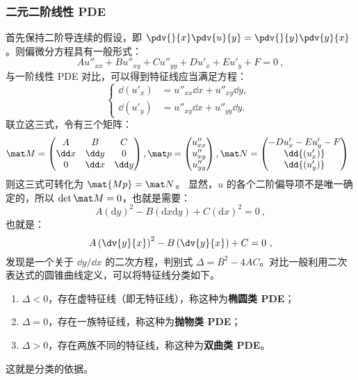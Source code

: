 \subsubsection{二元二阶线性 PDE}
首先保持二阶导连续的假设，即 $\pdv{}{x}\pdv{u}{y} = \pdv{}{y}\pdv{y}{x}$。则偏微分方程具有一般形式：
$$Au''_{xx} + Bu''_{xy} + Cu''_{yy} + Du'_{x} + Eu'_{y} + F = 0 ~,$$
与一阶线性 PDE 对比，可以得到特征线应当满足方程：
$$
\left\{
\begin{aligned}
\dd{(u'_{x})} &= u''_{xx} \dd x + u''_{xy} \dd y,\\
\dd{(u'_{y})} &= u''_{xy} \dd x + u''_{yy} \dd y.
\end{aligned}
\right. ~~$$
联立这三式，令有三个矩阵：
\begin{equation}
\mat M= 
\begin{pmatrix}
A & B & C \\
\dd x & \dd y & 0 \\
0 & \dd x & \dd y 
\end{pmatrix}, 
\mat p= 
\begin{pmatrix}
u''_{xx} \\
u''_{xy} \\
u''_{yy}
\end{pmatrix},
\mat N = 
\begin{pmatrix}
-D u'_{x} - E u'_{y} - F\\
\dd{(u'_{x})}\\
\dd{(u'_{y})}
\end{pmatrix}
~~
\end{equation}
则这三式可转化为 $\mat{Mp}=\mat N$。
显然，$u$ 的各个二阶偏导项不是唯一确定的，所以  $\det \mat M = 0$，也就是需要：
\begin{equation}
A\left(\mathrm{d} y\right)^2 - B\left(\mathrm{d} x \mathrm{d} y\right) + C\left(\mathrm{d} x\right)^2 =0
~,
\end{equation}
也就是：
\begin{equation}
A\left(\dv{y}{x}\right)^2 - B\left(\dv{y}{x}\right) + C = 0 ~,
\end{equation}
发现是一个关于 $\dd y/\dd x$ 的二次方程，判别式 $\Delta = B^2-4AC$。对比一般利用二次表达式的圆锥曲线定义，可以将特征线分类如下。
\begin{enumerate}
\item $\Delta < 0$，存在虚特征线（即无特征线），称这种为\textbf{椭圆类 PDE}；
\item $\Delta = 0$，存在一族特征线，称这种为\textbf{抛物类 PDE}；
\item $\Delta > 0$，存在两族不同的特征线，称这种为\textbf{双曲类 PDE}。
\end{enumerate}
这就是分类的依据。

